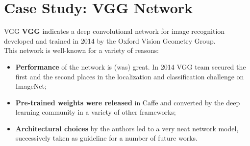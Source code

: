 \documentclass[aspectratio=169]{beamer}
\begin{document}

\section{Case Study: VGG Network}

\begin{frame}{VGG}
\textbf{VGG} \cite{simonyan2014very} indicates a deep convolutional network for image recognition developed and trained in 2014 by the Oxford Vision Geometry Group.\\
\vspace{0.25cm}
This network is well-known for a variety of reasons:
\begin{itemize}
\item \textbf{Performance} of the network is (was) great. In 2014 VGG team secured the first and the second places in the localization and classification challenge on ImageNet;
\item \textbf{Pre-trained weights were released} in Caffe \cite{jia2014caffe} and converted by the deep learning community in a variety of other frameworks;
\item \textbf{Architectural choices} by the authors led to a very neat network model, successively taken as guideline for a number of future works.
\end{itemize} 
\end{frame}

\end{document}
